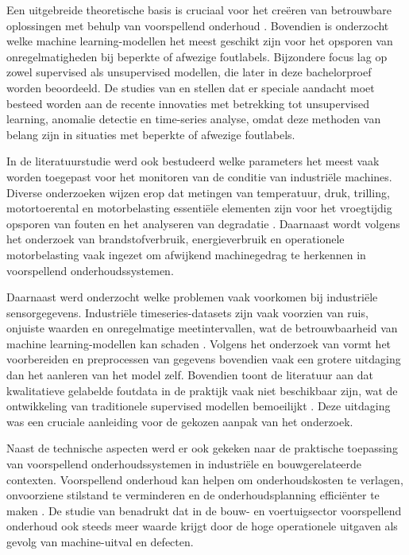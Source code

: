 Een uitgebreide theoretische basis is cruciaal voor het creëren van betrouwbare oplossingen met behulp van voorspellend onderhoud \autocite{Carvalho2019, Elahi2023}. Bovendien is onderzocht welke machine learning-modellen het meest geschikt zijn voor het opsporen van onregelmatigheden bij beperkte of afwezige foutlabels. Bijzondere focus lag op zowel supervised als unsupervised modellen, die later in deze bachelorproef worden beoordeeld. De studies van \textcite{Giannoulidis2024} en \textcite{Aggarwal2025} stellen dat er speciale aandacht moet besteed worden aan de recente innovaties met betrekking tot unsupervised learning, anomalie detectie en time-series analyse, omdat deze methoden van belang zijn in situaties met beperkte of afwezige foutlabels.

In de literatuurstudie werd ook bestudeerd welke parameters het meest vaak worden toegepast voor het monitoren van de conditie van industriële machines. Diverse onderzoeken wijzen erop dat metingen van temperatuur, druk, trilling, motortoerental en motorbelasting essentiële elementen zijn voor het vroegtijdig opsporen van fouten en het analyseren van degradatie \autocite{Touil2025, Nayak2024, Mahale2025}. Daarnaast wordt volgens het onderzoek van \textcite{Chen2025} brandstofverbruik, energieverbruik en operationele motorbelasting vaak ingezet om afwijkend machinegedrag te herkennen in voorspellend onderhoudssystemen.

Daarnaast werd onderzocht welke problemen vaak voorkomen bij industriële sens\-orgegevens. Industriële timeseries-datasets zijn vaak voorzien van ruis, onjuiste waarden en onregelmatige meetintervallen, wat de betrouwbaarheid van machine lear\-ning-modellen kan schaden \autocite{Dissem2024}. Volgens het onderzoek van \textcite{Carvalho2019} vormt het voorbereiden en preprocessen van gegevens bovendien vaak een grotere uitdaging dan het aanleren van het model zelf. Bovendien toont de literatuur aan dat kwalitatieve gelabelde foutdata in de praktijk vaak niet beschikbaar zijn, wat de ontwikkeling van traditionele supervised modellen bemoeilijkt \autocite{Elahi2023}. Deze uitdaging was een cruciale aanleiding voor de gekozen aanpak van het onderzoek.

Naast de technische aspecten werd er ook gekeken naar de praktische toepassing van voorspellend onderhoudssystemen in industriële en bouwgerelateerde contexten. Voorspellend onderhoud kan helpen om onderhoudskosten te verlagen, onvoorziene stilstand te verminderen en de onderhoudsplanning efficiënter te maken \autocite{ErRatby2025}. De studie van \textcite{Mikulic2024} benadrukt dat in de bouw- en voertuigsector voorspellend onderhoud ook steeds meer waarde krijgt door de hoge operationele uitgaven als gevolg van machine-uitval en defecten.


